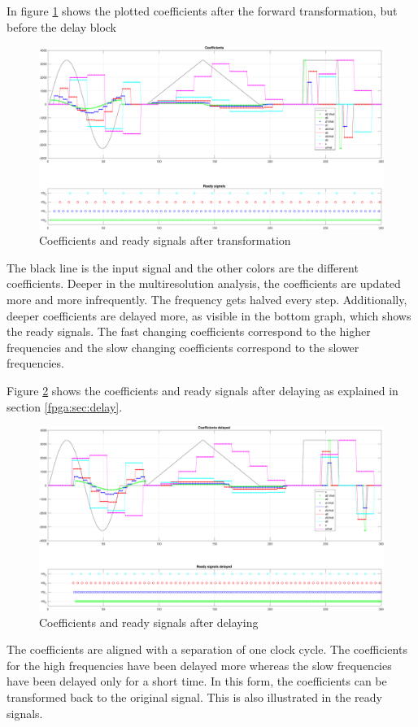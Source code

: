 \begin{refsection}
In figure \ref{fpga:fig:coeff} shows the plotted coefficients after the forward transformation, but before the delay block
\begin{figure}
	\centering
	\includegraphics[width=\textwidth]{papers/fpga/images/coefs_with_step.pdf}
	\caption{Coefficients and ready signals after transformation \label{fpga:fig:coeff}}
\end{figure}
The black line is the input signal and the other colors are the different coefficients.
Deeper in the multiresolution analysis, the coefficients are updated more and more infrequently.
The frequency gets halved every step.
Additionally, deeper coefficients are delayed more, as visible in the bottom graph, which shows the ready signals.
The fast changing coefficients correspond to the higher frequencies and the slow changing coefficients correspond to the slower frequencies.

Figure \ref{fpga:fig:coeff_delayed} shows the coefficients and ready signals after delaying as explained in section \ref{fpga:sec:delay}.
\begin{figure}
	\centering
	\includegraphics[width=\textwidth]{papers/fpga/images/coefs_delayed_with_step.pdf}
	\caption{Coefficients and ready signals after delaying \label{fpga:fig:coeff_delayed}}
\end{figure}
The coefficients are aligned with a separation of one clock cycle. 
The coefficients for the high frequencies have been delayed more whereas the slow frequencies have been delayed only for a short time. 
In this form, the coefficients can be transformed back to the original signal. 
This is also illustrated in the ready signals.


\end{refsection}
